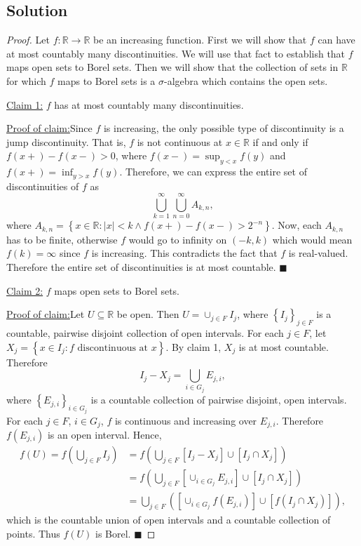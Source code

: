 \documentclass[12pt]{article}
\newenvironment{claimproof}[1]{\par\noindent\underline{Proof of claim:}\space#1}{\hfill $\blacksquare$\vspace{5mm}}
\begin{document}
\subsection*{Solution}
\begin{proof}
Let $f : \mathbb{R} \rightarrow \mathbb{R}$ be an increasing function. First we will show that $f$ can have at most countably many discontinuities. We
will use that fact to establish that $f$ maps open sets to Borel sets. Then we will show that the collection of sets in $\mathbb{R}$ for which $f$ maps
to Borel sets is a $\sigma$-algebra which contains the open sets.

\underline{Claim 1:} $f$ has at most countably many discontinuities.
\begin{claimproof}
Since $f$ is increasing, the only possible type of discontinuity is a jump discontinuity. That is, $f$ is not continuous at $x \in \mathbb{R}$ if and
only if $f(x+) - f(x-) > 0$, where $f(x-) = \sup_{y<x}f(y)$ and $f(x+) = \inf_{y>x}f(y)$. Therefore, we can express the entire set of discontinuities
of $f$ as 
\[ \bigcup_{k=1}^{\infty}\bigcup_{n=0}^{\infty}A_{k,n}, \]
where $A_{k,n} = \left\{ x \in \mathbb{R} : |x| < k \wedge f(x+) - f(x-) > 2^{-n} \right\}$. Now, each $A_{k,n}$ has to be finite, otherwise $f$ would
go to infinity on $(-k, k)$ which would mean $f(k) = \infty$ since $f$ is increasing. This contradicts the fact that $f$ is real-valued. Therefore the entire
set of discontinuities is at most countable.
\end{claimproof}

\underline{Claim 2:} $f$ maps open sets to Borel sets.
\begin{claimproof}
Let $U \subseteq \mathbb{R}$ be open. Then $U = \cup_{j\in F}I_{j}$, where $\left\{ I_{j} \right\}_{j\in F}$ is a countable, pairwise disjoint
collection of open intervals. For each $j \in F$, let $X_{j} = \left\{ x\in I_{j} : f \text{ discontinuous at }x \right\}$. By claim 1, $X_{j}$ is at
most countable. Therefore 
\[ I_{j} - X_{j} = \bigcup_{i \in G_{j}}E_{j,i},\] 
where $\left\{ E_{j,i} \right\}_{i\in G_{j}}$ is a countable collection of pairwise disjoint, open intervals. For each $j \in F$, $i \in G_{j}$, $f$ is
continuous and increasing over $E_{j,i}$. Therefore $f(E_{j,i})$ is an open interval. Hence,
\begin{align*} 
f(U) = f\left( \bigcup_{j\in F}I_{j} \right) & = f\left( \bigcup_{j\in F}[I_{j} - X_{j}]\cup [I_{j}\cap X_{j}] \right) \\
& = f\left( \bigcup_{j\in F}[\cup_{i \in G_{j}}E_{j,i}]\cup [I_{j}\cap X_{j}] \right) \\
& = \bigcup_{j \in F}\left( [ \cup_{i\in G_{j}}f(E_{j,i}) ] \cup \left[ f(I_{j} \cap X_{j}) \right] \right),
\end{align*}
which is the countable union of open intervals and a countable collection of points. Thus $f(U)$ is Borel.
\end{claimproof}


\end{proof}
\end{document}
